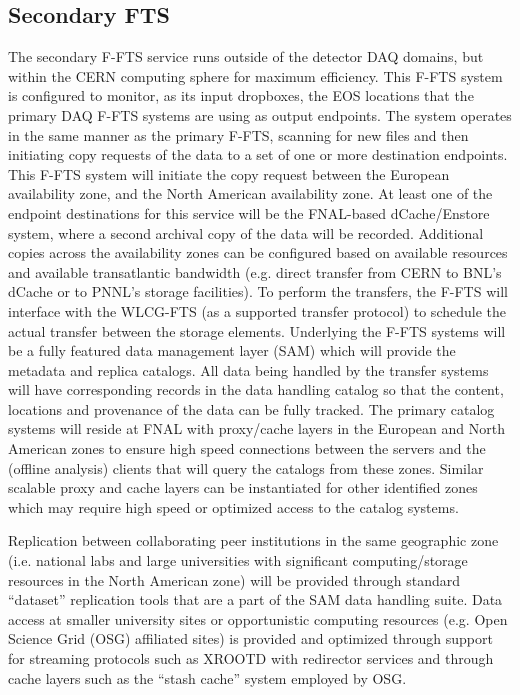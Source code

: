 \documentclass[pdftex,12pt,letter]{article}
\begin{document}
\subsection{Secondary FTS}
The secondary F-FTS service runs outside of the detector DAQ domains, but within the CERN computing sphere for maximum efficiency.
This F-FTS system is configured to monitor, as its input dropboxes, the EOS locations that the primary DAQ F-FTS systems are using as output endpoints.
The system operates in the same manner as the primary F-FTS, scanning for new files and then initiating copy requests of the data to a set of one or more destination endpoints.
This F-FTS system will initiate the copy request between the European availability zone, and the North American availability zone.  At least one of the endpoint destinations for
this service will be the FNAL-based dCache/Enstore system, where a second archival copy of the data will be recorded.  Additional copies across the availability zones can be
configured based on available resources and available transatlantic bandwidth (e.g. direct transfer from CERN to BNL’s dCache or to PNNL’s storage facilities). 
To perform the transfers, the F-FTS will interface with the WLCG-FTS (as a supported transfer protocol) to schedule the actual transfer between the storage elements.  
Underlying the F-FTS systems will be a fully featured data management layer (SAM) which will provide the metadata and replica catalogs.
All data being handled by the transfer systems will have corresponding records in the data handling catalog so that the content,
locations and provenance of the data can be fully tracked.  The primary catalog systems will reside at FNAL with proxy/cache
layers in the European and North American zones to ensure high speed connections between the servers and the (offline analysis)
clients that will query the catalogs from these zones.  Similar scalable proxy and cache layers can be instantiated for other identified
zones which may require high speed or optimized access to the catalog systems.
 
Replication between collaborating peer institutions in the same geographic zone  (i.e. national labs and large universities with significant computing/storage resources in the North American zone) will be provided through standard “dataset” replication tools that are a part of the SAM data handling suite.  Data access at smaller university sites or opportunistic computing resources (e.g. Open Science Grid (OSG) affiliated sites) is provided and optimized through support for streaming protocols such as XROOTD with redirector services and through cache layers such as the “stash cache” system employed by OSG.  
\end{document}
